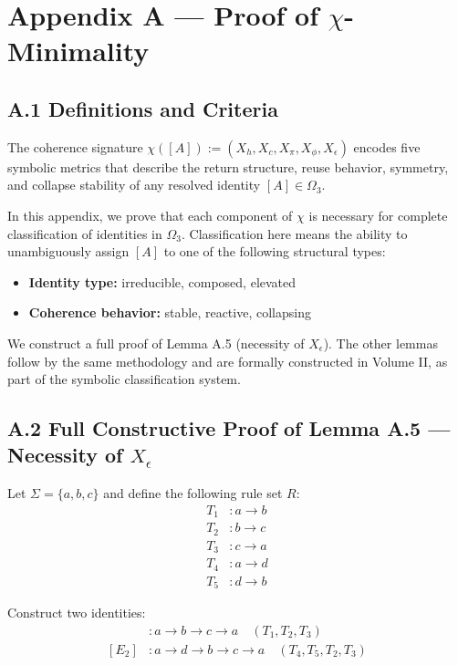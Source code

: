 \appendix
\section*{Appendix A — Proof of $\chi$-Minimality}

\subsection*{A.1 Definitions and Criteria}

The coherence signature $\chi([A]) := (X_h, X_c, X_\pi, X_\phi, X_\epsilon)$ encodes five symbolic metrics that describe the return structure, reuse behavior, symmetry, and collapse stability of any resolved identity $[A] \in \Omega_3$.

In this appendix, we prove that each component of $\chi$ is necessary for complete classification of identities in $\Omega_3$. Classification here means the ability to unambiguously assign $[A]$ to one of the following structural types:
\begin{itemize}
  \item \textbf{Identity type:} irreducible, composed, elevated
  \item \textbf{Coherence behavior:} stable, reactive, collapsing
\end{itemize}

We construct a full proof of Lemma A.5 (necessity of $X_\epsilon$). The other lemmas follow by the same methodology and are formally constructed in Volume II, as part of the symbolic classification system.

\subsection*{A.2 Full Constructive Proof of Lemma A.5 — Necessity of $X_\epsilon$}

Let $\Sigma = \{a, b, c\}$ and define the following rule set $R$:
\begin{align*}
    T_1 &: a \rightarrow b \\
    T_2 &: b \rightarrow c \\
    T_3 &: c \rightarrow a \\
    T_4 &: a \rightarrow d \\
    T_5 &: d \rightarrow b
\end{align*}

Construct two identities:
\begin{align*}
    [E_1] &: a \rightarrow b \rightarrow c \rightarrow a \quad (T_1, T_2, T_3) \\
    [E_2] &: a \rightarrow d \rightarrow b \rightarrow c \rightarrow a \quad (T_4, T_5, T_2, T_3)
\end{align*}

